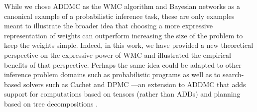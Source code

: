 While we chose \textsf{ADDMC} \citep{DBLP:conf/aaai/DudekPV20} as the WMC
algorithm and Bayesian networks as a canonical example of a probabilistic
inference task, these are only examples meant to illustrate the broader idea
that choosing a more expressive representation of weights can outperform
increasing the size of the problem to keep the weights simple. Indeed, in this
work, we have provided a new theoretical perspective on the expressive power of
WMC and illustrated the empirical benefits of that perspective. Perhaps the same
idea could be adapted to other inference problem domains such as probabilistic
programs
\citep{DBLP:journals/tplp/FierensBRSGTJR15,DBLP:journals/corr/abs-2005-09089} as
well as to search-based solvers such as \textsf{Cachet}
\citep{DBLP:conf/sat/SangBBKP04} and \textsf{DPMC} ---an extension to
\textsf{ADDMC} that adds support for computations based on tensors (rather than
ADDs) and planning based on tree decompositions \citep{DBLP:conf/cp/DudekPV20}.
